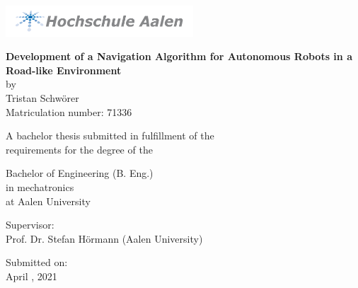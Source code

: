 \begin{titlepage}

\center\includegraphics[width=70mm]{Pictures/Logo_HSAA}

\vspace*{8mm} %
\begin{center} %
	
	\Huge\center\textbf{Development of a Navigation Algorithm for Autonomous Robots in a Road-like Environment}\\ %
	\vspace*{11mm}
	\Large{by}\\
	\Large{Tristan Schwörer}\\
	\Large{Matriculation number: 71336}\\
	
	\vspace*{11mm}
	
	\Large{A bachelor thesis submitted in fulfillment of the}\\
	\Large{requirements for the degree of the}\\
	
	\vspace*{11mm}
	
	\Large{Bachelor of Engineering (B. Eng.)}\\
	\Large{in mechatronics}\\
	\Large{at Aalen University}\\
	
	\vspace*{11mm}
	
	\Large{Supervisor:}\\
	\Large{Prof. Dr. Stefan Hörmann (Aalen University)}\\
	
	\vspace*{11mm}
	
	\Large{Submitted on:}\\
	\Large{April , 2021}\\
	
\end{center}
\end{titlepage}
